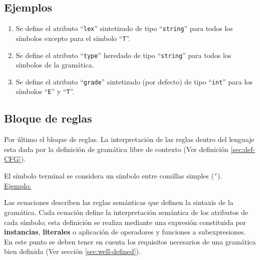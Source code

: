 \subsection*{Ejemplos}
\begin{enumerate}

\item 
\begin{center}
\end{center}
\vspace{0.2cm}
Se define el atributo ``\texttt{lex}'' sintetizado de tipo ``\texttt{string}'' para todos los símbolos excepto para el símbolo ``\texttt{T}''.

\item

\begin{center}
\end{center}
\vspace{0.2cm}
Se define el atributo ``\texttt{type}'' heredado de tipo ``\texttt{string}'' para todos los símbolos de la gramática.

\item 

\begin{center}
\end{center}
\vspace{0.2cm}
Se define el atributo ``\texttt{grade}'' sintetizado (por defecto) de tipo ``\texttt{int}'' para los símbolos ``\texttt{E}'' y ``\texttt{T}''.\\
\end{enumerate}

\subsection{Bloque de reglas}
Por último el bloque de reglas. La interpretación de las reglas dentro del lenguaje esta dada por la definición de gramática libre de contexto (Ver definición \ref{sec:def-CFG}).          

El símbolo terminal se considera un símbolo entre comillas simples (\texttt{'}).\\ 

\underline{Ejemplo:}\ \\
\vspace{0.2cm}

Las ecuaciones describen las reglas semánticas que definen la sintaxis de la gramática. Cada ecuación define la interpretación semántica de los atributos de cada símbolo; esta definición se realiza mediante una expresión constituida por \textbf{instancias}, \textbf{literales} o aplicación de operadores y funciones a subexpresiones.
En este punto se deben tener en cuenta los requisitos necesarios de una gramática bien definida (Ver sección \ref{sec:well-defined}).

